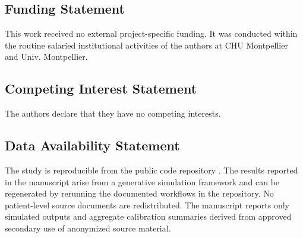 \documentclass[12pt]{article}
\begin{document}
\subsection{Funding Statement}
This work received no external project-specific funding. It was conducted within the routine salaried institutional activities of the authors at CHU Montpellier and Univ. Montpellier.

\subsection{Competing Interest Statement}
The authors declare that they have no competing interests.

\subsection{Data Availability Statement}
The study is reproducible from the public code repository \cite{rfrgithub}. The results reported in the manuscript arise from a generative simulation framework and can be regenerated by rerunning the documented workflows in the repository. No patient-level source documents are redistributed. The manuscript reports only simulated outputs and aggregate calibration summaries derived from approved secondary use of anonymized source material.
\end{document}
